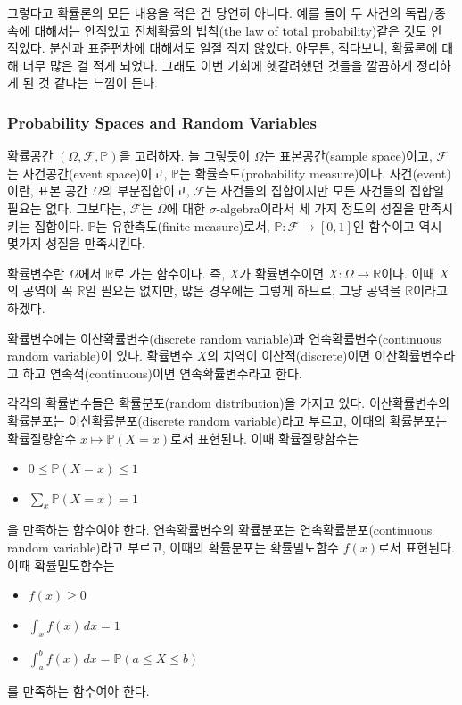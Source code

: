 \documentclass{article}
\begin{document}
그렇다고 확률론의 모든 내용을 적은 건 당연히 아니다.
예를 들어 두 사건의 독립/종속에 대해서는 안적었고 전체확률의 법칙(the law of total probability)같은 것도 안 적었다.
분산과 표준편차에 대해서도 일절 적지 않았다.
아무튼, 적다보니, 확률론에 대해 너무 많은 걸 적게 되었다.
그래도 이번 기회에 헷갈려했던 것들을 깔끔하게 정리하게 된 것 같다는 느낌이 든다.

%
\subsubsection{Probability Spaces and Random Variables}
확률공간 \((\Omega,\mathcal F,\mathbb P)\)을 고려하자.
늘 그렇듯이 \(\Omega\)는 표본공간(sample space)이고, \(\mathcal F\)는 사건공간(event space)이고, \(\mathbb P\)는 확률측도(probability measure)이다.
사건(event)이란, 표본 공간 \(\Omega\)의 부분집합이고, \(\mathcal F\)는 사건들의 집합이지만 모든 사건들의 집합일 필요는 없다. 그보다는, \(\mathcal F\)는 \(\Omega\)에 대한 \(\sigma\)-algebra이라서 세 가지 정도의 성질을 만족시키는 집합이다.
\(\mathbb P\)는 유한측도(finite measure)로서, \(\mathbb P:\mathcal F\to[0,1]\)인 함수이고 역시 몇가지 성질을 만족시킨다.

확률변수란 \(\Omega\)에서 \(\mathbb R\)로 가는 함수이다.
즉, \(X\)가 확률변수이면 \(X:\Omega\to\mathbb R\)이다.
이때 \(X\)의 공역이 꼭 \(\mathbb R\)일 필요는 없지만, 많은 경우에는 그렇게 하므로, 그냥 공역을 \(\mathbb R\)이라고 하겠다.

확률변수에는 이산확률변수(discrete random variable)과 연속확률변수(continuous random variable)이 있다.
확률변수 \(X\)의 치역이 이산적(discrete)이면 이산확률변수라고 하고 연속적(continuous)이면 연속확률변수라고 한다.

각각의 확률변수들은 확률분포(random distribution)을 가지고 있다.
이산확률변수의 확률분포는 이산확률분포(discrete random variable)라고 부르고, 이때의 확률분포는 확률질량함수 \(x\mapsto\mathbb P(X=x)\)로서 표현된다.
이때 확률질량함수는
\begin{itemize}
\item
\(0\le\mathbb P(X=x)\le1\)
\item
\(\sum_x\mathbb P(X=x)=1\)
\end{itemize}
을 만족하는 함수여야 한다.
연속확률변수의 확률분포는 연속확률분포(continuous random variable)라고 부르고, 이때의 확률분포는 확률밀도함수 \(f(x)\)로서 표현된다.
이때 확률밀도함수는
\begin{itemize}
\item
\(f(x)\ge0\)
\item
\(\int_xf(x)\,dx=1\)
\item
\(\int_a^bf(x)\,dx=\mathbb P(a\le X\le b)\)
\end{itemize}
를 만족하는 함수여야 한다.
\end{document}
